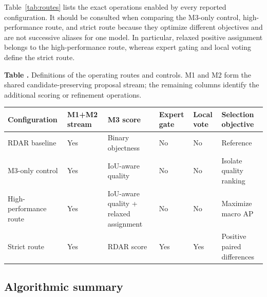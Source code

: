 \documentclass[sensors,article,submit,pdftex,moreauthors]{Definitions/mdpi}
\providecommand{\tabref}[1]{}
\renewcommand{\tabref}[1]{\textcolor{floatreviewblue}{Table~\ref{#1}}}
\renewcommand{\tabref}[1]{Table~\ref{#1}}
\begin{document}
\tabref{tab:routes} lists the exact operations enabled by every reported
configuration. It should be consulted when comparing the M3-only control,
high-performance route, and strict route because they optimize different
objectives and are not successive aliases for one model. In particular,
relaxed positive assignment belongs to the high-performance route, whereas
expert gating and local voting define the strict route.

\begin{samepage}
\noindent\begin{minipage}{\textwidth}
\label{tab:routes}
\noindent\textbf{Table \thetable.} Definitions of the operating routes and
controls. M1 and M2 form the shared candidate-preserving proposal stream; the
remaining columns identify the additional scoring or refinement operations.\par
\vspace{2pt}
\scriptsize
\begin{tabularx}{\textwidth}{@{}
>{\raggedright\arraybackslash}X
>{\raggedright\arraybackslash}X
>{\raggedright\arraybackslash}X
>{\raggedright\arraybackslash}X
>{\raggedright\arraybackslash}X
>{\raggedright\arraybackslash}X@{}}
\toprule
Config\-uration & M1+M2 stream & M3 score & Expert gate & Local vote & Selection objective \\
\midrule
RDAR baseline & Yes & Binary objectness & No & No & Reference \\
M3-only control & Yes & IoU-aware quality & No & No & Isolate quality ranking \\
High-performance route & Yes & IoU-aware quality + relaxed assignment & No & No & Maximize macro AP \\
Strict route & Yes & RDAR score & Yes & Yes & Positive paired differences \\
\bottomrule
\end{tabularx}
\end{minipage}
\end{samepage}

\subsection{Algorithmic summary}
\end{document}
